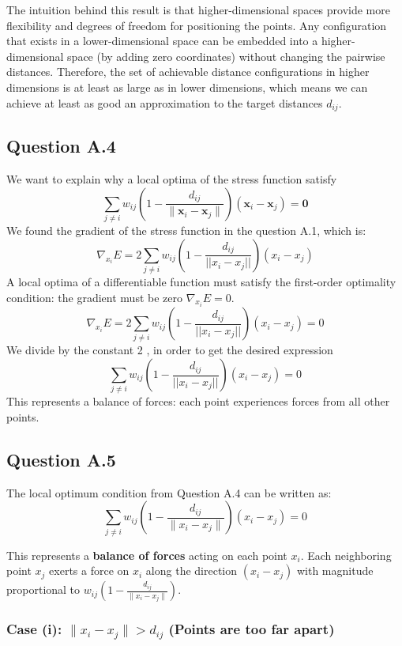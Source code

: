 \documentclass[a4paper]{scrartcl}
\begin{document}
The intuition behind this result is that higher-dimensional spaces provide more flexibility and degrees of freedom for positioning the points. Any configuration that exists in a lower-dimensional space can be embedded into a higher-dimensional space (by adding zero coordinates) without changing the pairwise distances. Therefore, the set of achievable distance configurations in higher dimensions is at least as large as in lower dimensions, which means we can achieve at least as good an approximation to the target distances $d_{ij}$.

\subsection*{Question A.4}
We want to explain why a local optima of the stress function satisfy $$\sum_{j \neq i} w_{ij} \left(1 - \frac{d_{ij}}{\|\mathbf{x}_i - \mathbf{x}_j\|}\right)(\mathbf{x}_i - \mathbf{x}_j) = \mathbf{0}$$
We found the gradient of the stress function in the question A.1, which is:
\[
\nabla_{x_i} E = 2 \sum_{j\ne i} w_{ij} \left(1-\frac{d_{ij}}{||x_i - x_j||}\right)(x_i-x_j)
\]
A local optima of a differentiable function must satisfy the first-order optimality condition: the gradient must be zero $\nabla_{x_i} E = 0$.
\[
\nabla_{x_i} E = 2 \sum_{j\ne i} w_{ij} \left(1-\frac{d_{ij}}{||x_i - x_j||}\right)(x_i-x_j) = 0
\]
We divide by the constant 2 , in order to get the desired expression
\[
 \sum_{j\ne i} w_{ij} \left(1-\frac{d_{ij}}{||x_i - x_j||}\right)(x_i-x_j) = 0
\]
This represents a balance of forces: each point experiences forces from all other points.

\subsection*{Question A.5}

The local optimum condition from Question A.4 can be written as:
\[
\sum_{j \neq i} w_{ij} \left(1 - \frac{d_{ij}}{\|x_i - x_j\|}\right) (x_i - x_j) = 0
\]

This represents a \textbf{balance of forces} acting on each point $x_i$. Each neighboring point $x_j$ exerts a force on $x_i$ along the direction $(x_i -x_j)$ with magnitude proportional to $w_{ij}\left(1 - \frac{d_{ij}}{\|x_i - x_j\|}\right)$.

\subsubsection*{Case (i): $\|x_i - x_j\| > d_{ij}$ (Points are too far apart)}
\end{document}
